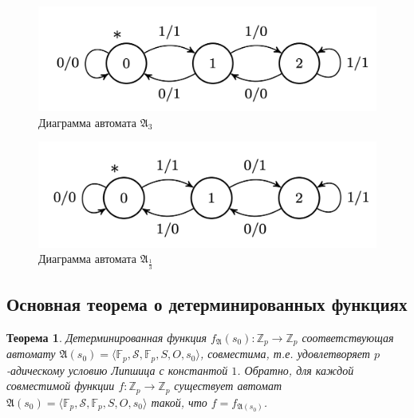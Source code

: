 \documentclass[och, master]{SCWorks}
\theoremstyle{plain}
\newtheorem{thethm}{Теорема}
\theoremstyle{plain}
\theoremstyle{plain}
\theoremstyle{definition}
\begin{document}
\begin{figure}[H]
\centerline{\includegraphics[width=0.5\linewidth]{img/automata_6}}
\caption{Диаграмма автомата $\mathfrak{A}_3$}
\label{img:automata:6}
\end{figure}

\begin{figure}[H]
\centerline{\includegraphics[width=0.5\linewidth]{img/automata_7}}
\caption{Диаграмма автомата $\mathfrak{A}_{\frac{1}{3}}$}
\label{img:automata:7}
\end{figure}


\subsection{Основная теорема о детерминированных функциях}
\begin{thethm}\cite{bib:crypto:anashin}
Детерминированная функция $f_\mathfrak{A}(s_0): \mathbb {Z}_p \rightarrow \mathbb {Z}_p$ соответствующая автомату $\mathfrak{A}(s_0)=\langle\mathbb {F}_p, \mathcal{S}, \mathbb {F}_p, S, O, s_0\rangle$, совместима, т.е. удовлетворяет $p$-адическому условию Липшица с константой $1$. Обратно, для каждой совместимой функции $f: \mathbb {Z}_p \rightarrow \mathbb {Z}_p$ существует автомат $\mathfrak{A}(s_0)=\langle\mathbb {F}_p, \mathcal{S}, \mathbb {F}_p, S, O, s_0\rangle$ такой, что $f=f_{\mathfrak{A}(s_0)}$.
\end{thethm}
\end{document}

